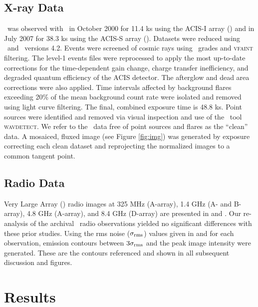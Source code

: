 \documentclass[iop]{emulateapj}
\begin{document}
\subsection{X-ray Data}
\label{sec:xray}

\rbs\ was observed with \cxo\ in October 2000 for 11.4 ks using the
ACIS-I array () and in
July 2007 for 38.3 ks using the ACIS-S array (). Datasets were reduced using
\ciao\ and \caldb\ versions 4.2. Events were screened of cosmic rays
using \asca\ grades and {\textsc{vfaint}} filtering. The level-1
events files were reprocessed to apply the most up-to-date corrections
for the time-dependent gain change, charge transfer inefficiency, and
degraded quantum efficiency of the ACIS detector. The afterglow and
dead area corrections were also applied. Time intervals affected by
background flares exceeding 20\% of the mean background count rate
were isolated and removed using light curve filtering. The final,
combined exposure time is 48.8 ks. Point sources were identified and
removed via visual inspection and use of the \ciao\ tool
{\textsc{wavdetect}}. We refer to the \cxo\ data free of point sources
and flares as the ``clean'' data. A mosaiced, fluxed image (see Figure
\ref{fig:img}) was generated by exposure correcting each clean dataset
and reprojecting the normalized images to a common tangent point.

\subsection{Radio Data}
\label{sec:radio}

Very Large Array (\vla) radio images at 325 MHz (A-array), 1.4 GHz (A-
and B-array), 4.8 GHz (A-array), and 8.4 GHz (D-array) are presented
in \citet{gitti06} and \citet{birzan08}. Our re-analysis of the
archival \vla\ radio observations yielded no significant differences
with these prior studies. Using the rms noise ($\sigma_{\rm{rms}}$)
values given in \citet{gitti06} and \citet{birzan08} for each
observation, emission contours between $3\sigma_{\rm{rms}}$ and the
peak image intensity were generated. These are the contours referenced
and shown in all subsequent discussion and figures.

\section{Results}
\label{sec:results}
\end{document}
